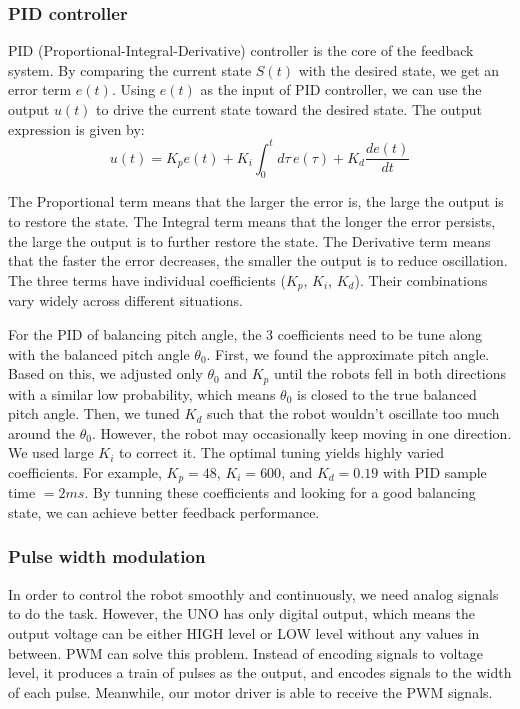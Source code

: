 \documentclass[9pt,a4paper,twocolumn]{tau-class/tau}
\begin{document}
\subsubsection{PID controller}
PID (Proportional-Integral-Derivative) controller is the core of the feedback system. By comparing the current state $S(t)$ with the desired state, we get an error term $e(t)$. Using $e(t)$ as the input of PID controller, we can use the output $u(t)$ to drive the current state toward the desired state. The output expression is given by:
\begin{equation}
	u(t)=K_pe(t)+K_i\int_{0}^{t}{d\tau\,e(\tau)}+K_d\frac{de(t)}{dt}
\end{equation}

The Proportional term means that the larger the error is, the large the output is to restore the state. The Integral term means that the longer the error persists, the large the output is to further restore the state. The Derivative term means that the faster the error decreases, the smaller the output is to reduce oscillation. The three terms have individual coefficients ($K_p$, $K_i$, $K_d$). Their combinations vary widely across different situations.

For the PID of balancing pitch angle, the 3 coefficients need to be tune along with the balanced pitch angle $\theta_0$. First, we found the approximate pitch angle. Based on this, we adjusted only $\theta_0$ and $K_p$ until the robots fell in both directions with a similar low probability, which means $\theta_0$ is closed to the true balanced pitch angle. Then, we tuned $K_d$ such that the robot wouldn't oscillate too much around the $\theta_0$. However, the robot may occasionally keep moving in one direction. We used large $K_i$ to correct it. The optimal tuning yields highly varied coefficients. For example, $K_p=48$, $K_i=600$, and $K_d=0.19$ with PID sample time $=2ms$. By tunning these coefficients and looking for a good balancing state, we can achieve better feedback performance. 

\subsubsection{Pulse width modulation}
In order to control the robot smoothly and continuously, we need analog signals to do the task. However, the UNO has only digital output, which means the output voltage can be either HIGH level or LOW level without any values in between. PWM can solve this problem. Instead of encoding signals to voltage level, it produces a train of pulses as the output, and encodes signals to the width of each pulse. Meanwhile, our motor driver is able to receive the PWM signals.
\end{document}
